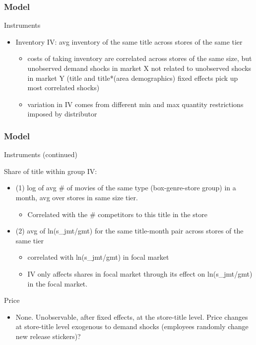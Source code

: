 \documentclass[notes=show]{beamer}
\begin{document}

\begin{frame}
\frametitle{Model}

Instruments

\begin{itemize}
\item Inventory IV: avg inventory of the same title across stores of the
same tier

\begin{itemize}
\item costs of taking inventory are correlated across stores of the same
size, but unobserved demand shocks in market X not related to unobserved
shocks in market Y (title and title*(area demographics) fixed
effects pick up most correlated shocks)

\item variation in IV comes from different min and max quantity restrictions
imposed by distributor
\end{itemize}
\end{itemize}
\end{frame}


\begin{frame}
\frametitle{Model}

Instruments (continued)

Share of title within group IV:

\begin{itemize}
\item (1) log of avg \# of movies of the same type (box-genre-store group)
in a month, avg over stores in same size tier.

\begin{itemize}
\item Correlated with the \# competitors to this title in the store
\end{itemize}

\item (2) avg of ln(s\_jmt/gmt) for the same title-month pair across stores
of the same tier

\begin{itemize}
\item correlated with ln(s\_jmt/gmt) in focal market

\item IV only affects shares in focal market through its effect on
ln(s\_jmt/gmt) in the focal market.
\end{itemize}
\end{itemize}

Price

\begin{itemize}
\item None. Unobservable, after fixed effects, at the store-title level.
Price changes at store-title level exogenous to demand shocks
(employees randomly change new release stickers)?
\end{itemize}
\end{frame}
\end{document}

